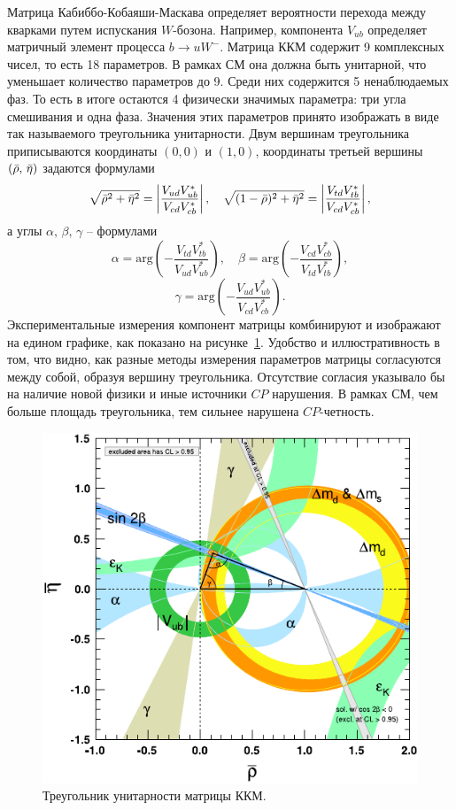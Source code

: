 \documentclass[a4paper, 10pt, twocolumn]{article}
\begin{document}
Матрица Кабиббо-Кобаяши-Маскава определяет вероятности перехода между 
кварками путем испускания $W$-бозона. Например, компонента $V_{ub}$ 
определяет матричный элемент процесса $b \to u W^-$. Матрица ККМ 
содержит 9 комплексных чисел, то есть 18 параметров. В рамках СМ она 
должна быть унитарной, что уменьшает количество параметров до 9. Среди 
них содержится 5 ненаблюдаемых фаз. То есть в итоге остаются 
4 физически значимых параметра: три угла смешивания и одна фаза. 
Значения этих параметров принято изображать в виде так называемого 
треугольника унитарности. Двум вершинам треугольника приписываются 
координаты $(0,0)$ и $(1,0)$, координаты третьей вершины 
$(\bar{\rho},\,\bar{\eta})$ задаются формулами
$$ \sqrt{\bar{\rho}^2 + \bar{\eta}^2} = \left| \frac{V_{ud} V_{ub}^*}{V_{cd} V_{cb}^*} \right|, \quad
\sqrt{(1-\bar{\rho})^2 + \bar{\eta}^2} = \left| \frac{V_{td} V_{tb}^*}{V_{cd} V_{cb}^*} \right|, $$
а углы $\alpha, \, \beta, \, \gamma$ -- формулами
$$
\alpha = \mathrm{arg}\left(-\frac{V_{td} V_{tb}^*}{V_{ud} V_{ub}^*}\right),
\quad
\beta  = \mathrm{arg}\left(-\frac{V_{cd} V_{cb}^*}{V_{td} V_{tb}^*}\right),
$$$$
\gamma = \mathrm{arg}\left(-\frac{V_{ud} V_{ub}^*}{V_{cd} V_{cb}^*}\right).
$$ 
Экспериментальные измерения компонент матрицы комбинируют и изображают 
на едином графике, как показано на рисунке~\ref{fig:triangle}. Удобство 
и иллюстративность в том, что видно, как разные методы измерения 
параметров матрицы согласуются между собой, образуя вершину 
треугольника. Отсутствие согласия указывало бы на наличие новой физики 
и иные источники $CP$ нарушения. В рамках СМ, чем больше площадь 
треугольника, тем сильнее нарушена $CP$-четность.

\begin{figure}%
	\centering
	\includegraphics[width=\linewidth]{figures/triangle}
	\caption{Треугольник унитарности матрицы ККМ.}
	\label{fig:triangle}
\end{figure}%
\end{document}
